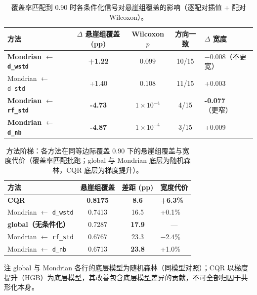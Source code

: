 \documentclass[UTF8, 11pt, a4paper]{ctexart}
\newcommand{\sig}[1]{\texttt{#1}}
\begin{document}
\begin{table}[htbp]
  \centering
  \caption{覆盖率匹配到 0.90 时各条件化信号对悬崖组覆盖的影响（逐配对插值 + 配对 Wilcoxon）。}
  \label{tab:covmatch}
  \begin{tabular}{@{} l S[table-format=+1.2] c c l @{}}
    \toprule
    方法 & {$\Delta$ 悬崖组覆盖 (pp)} & {Wilcoxon $p$} & {方向一致} & {$\Delta$ 宽度} \\
    \midrule
    \textbf{Mondrian $\leftarrow$ \sig{d\_wstd}} & {\bfseries +1.22} & $0.099$ & 10/15 & $-0.008$（不更宽） \\
    Mondrian $\leftarrow$ \sig{d\_std}  & +1.40 & $0.108$ & 11/15 & +0.003 \\
    \textbf{Mondrian $\leftarrow$ \sig{rf\_std}} & {\bfseries -4.73} & $1\times10^{-4}$ & 4/15 & {\bfseries -0.077}（更窄） \\
    \textbf{Mondrian $\leftarrow$ \sig{d\_nb}}   & {\bfseries -4.87} & $1\times10^{-4}$ & 3/15 & +0.009 \\
    \bottomrule
  \end{tabular}
\end{table}

\begin{table}[htbp]
  \centering
  \caption{方法阶梯：各方法在同等边际覆盖 0.90 下的悬崖组覆盖与宽度代价（覆盖率匹配批跑；global 与 Mondrian 底层为随机森林，CQR 底层为梯度提升）。}
  \label{tab:ladder}
  \begin{threeparttable}
  \begin{tabular}{@{} l S[table-format=1.4] S[table-format=2.1] l @{}}
    \toprule
    方法 & {悬崖组覆盖} & {差距 (pp)} & {宽度代价} \\
    \midrule
    \textbf{CQR}                         & {\bfseries 0.8175} & {\bfseries 8.6}  & {\bfseries +6.3\%} \\
    Mondrian $\leftarrow$ \sig{d\_wstd}  & 0.7413 & 16.5 & +0.1\% \\
    \textbf{global（无条件化）}          & 0.7287 & {\bfseries 17.9} &  \\
    Mondrian $\leftarrow$ \sig{rf\_std} & 0.6767 & 23.3 & $-2.4\%$ \\
    Mondrian $\leftarrow$ \sig{d\_nb}    & 0.6713 & {\bfseries 23.8} & +1.0\% \\
    \bottomrule
  \end{tabular}
  \begin{tablenotes}\footnotesize
    \item[注] global 与 Mondrian 各行的底层模型为随机森林（同模型对照）；CQR 以梯度提升（HGB）为底层模型，其改善包含底层模型差异的贡献，不可全部归因于共形化本身。
  \end{tablenotes}
  \end{threeparttable}
\end{table}
\end{document}
